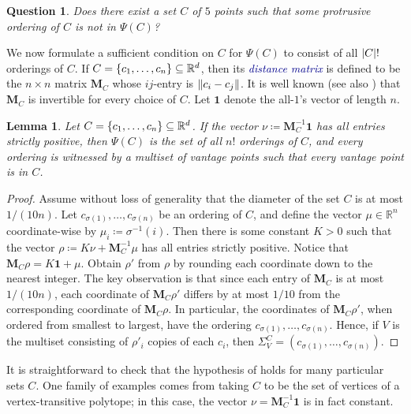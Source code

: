 \documentclass[11pt]{amsart}
\newtheorem{question}[theorem]{Question}
\newtheorem{lemma}[theorem]{Lemma}
\theoremstyle{definition}
\DeclarePairedDelimiter{\set}{\{}{\}}
\DeclarePairedDelimiter{\abs}{\lvert}{\rvert}
\DeclarePairedDelimiter{\Abs}{\lVert}{\rVert}
\newcommand{\RR}{\mathbb{R}}
\newcommand{\dfn}[1]{\textcolor{darkblue}{\emph{#1}}}
\begin{document}
\begin{question}
Does there exist a set $C$ of $5$ points such that some protrusive ordering of $C$ is not in $\Psi(C)$?
\end{question}

We now formulate a sufficient condition on $C$ for $\Psi(C)$ to consist of all $\abs{C}!$ orderings of $C$.  If $C=\set{c_1, \ldots, c_n} \subseteq \RR^d$, then its \dfn{{distance matrix}} is defined to be the $n \times n$ matrix ${\mathbf M}_C$ whose $ij$-entry is $\Abs{c_i-c_j}$.  It is well known \cite{Schoenberg1937} (see also \cite{Ball1992}) that ${\mathbf M}_C$ is invertible for every choice of $C$.  Let $\mathbf{1}$ denote the all-$1$'s vector of length $n$.

\begin{lemma}\label{lem:dist-matrix}
Let $C=\set{c_1, \ldots, c_n} \subseteq \RR^d$.  If the vector $\nu\coloneqq{\mathbf M}_C^{-1}{\mathbf 1}$ has all entries strictly positive, then $\Psi(C)$ is the set of all $n!$ orderings of $C$, and every ordering is witnessed by a multiset of vantage points such that every vantage point is in $C$.
\end{lemma}

\begin{proof}
Assume without loss of generality that the diameter of the set $C$ is at most $1/(10n)$.  Let $c_{\sigma(1)}, \ldots, c_{\sigma(n)}$ be an ordering of $C$, and define the vector $\mu \in \RR^n$ coordinate-wise by $\mu_i\coloneqq\sigma^{-1}(i)$.  Then there is some constant $K>0$ such that the vector $\rho\coloneqq K\nu+{\mathbf M}_C^{-1}\mu$ has all entries strictly positive.  Notice that ${\mathbf M}_C \rho=K{\mathbf 1}+\mu$.  Obtain $\rho'$ from $\rho$ by rounding each coordinate down to the nearest integer.  The key observation is that since each entry of $\mathbf{M}_C$ is at most $1/(10n)$, each coordinate of ${\mathbf M}_C \rho'$ differs by at most $1/10$ from the corresponding coordinate of $\mathbf{M}_C \rho$.  In particular, the coordinates of ${\mathbf M}_C \rho'$, when ordered from smallest to largest, have the ordering $c_{\sigma(1)}, \ldots, c_{\sigma(n)}$.  Hence, if $V$ is the multiset consisting of $\rho'_i$ copies of each $c_i$, then $\Sigma_V^C=(c_{\sigma(1)}, \ldots, c_{\sigma(n)})$.
\end{proof}

It is straightforward to check that the hypothesis of  holds for many particular sets $C$.  One family of examples comes from taking $C$ to be the set of vertices of a vertex-transitive polytope; in this case, the vector $\nu={\mathbf M}_C^{-1}{\mathbf 1}$ is in fact constant.
\end{document}
